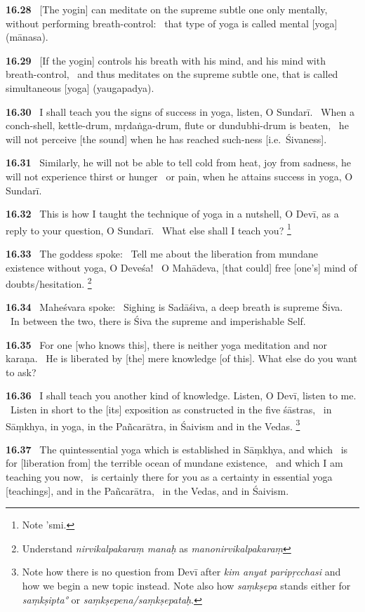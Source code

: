\documentclass{article}
\newcommand{\skt}[1]{\textit{#1}}
\begin{document}
\textbf{16.28}%
\ [The yogin] can meditate on the supreme subtle one only mentally, without performing breath-control:%
\                   that type of yoga is called mental [yoga] (mānasa).%


\textbf{16.29}%
\ [If the yogin] controls his breath with his mind, and his mind with breath-control,%
\                 and thus meditates on the supreme subtle one, that is called simultaneous [yoga] (yaugapadya).%


\textbf{16.30}%
\ I shall teach you the signs of success in yoga, listen, O Sundarī.%
\ When a conch-shell, kettle-drum, mṛdaṅga-drum, flute or dundubhi-drum is beaten,%
\                  he will not perceive [the sound] when he has reached such-ness [i.e.\ Śivaness].%


\textbf{16.31}%
\ Similarly, he will not be able to tell cold from heat, joy from sadness, he will not experience thirst or hunger%
\  or pain, when he attains success in yoga, O Sundarī.%


\textbf{16.32}%
\ This is how I taught the technique of yoga in a nutshell, O Devī, as a reply to your question, O Sundarī.%
\ What else shall I teach you?%
\footnote{Note 'smi. }%


\textbf{16.33}%
\ The goddess spoke:%
\ Tell me about the liberation from mundane existence without yoga, O Deveśa!%
\ O Mahādeva, [that could] free [one's] mind of doubts/hesitation.%
\footnote{Understand \skt{nirvikalpakaraṃ manaḥ} as \skt{manonirvikalpakaraṃ} }%


\textbf{16.34}%
\ Maheśvara spoke:%
\ Sighing is Sadāśiva, a deep breath is supreme Śiva.%
\ In between the two, there is Śiva the supreme and imperishable Self.%


\textbf{16.35}%
\ For one [who knows this], there is neither yoga meditation and nor karaṇa.%
\ He is liberated by [the] mere knowledge [of this]. What else do you want to ask?%


\textbf{16.36}%
\ I shall teach you another kind of knowledge. Listen, O Devī, listen to me.%
\ Listen in short to the [its] exposition as constructed in the five śāstras,%
\ in Sāṃkhya, in yoga, in the Pañcarātra, in Śaivism and in the Vedas.%
\footnote{Note how there is no question from Devī after \skt{kim anyat paripṛcchasi} and how we begin a new topic instead.                Note also how \skt{saṃkṣepa} stands either for \skt{saṃkṣipta°} or \skt{saṃkṣepena/saṃkṣepataḥ}. }%


\textbf{16.37}%
\ The quintessential yoga which is established in Sāṃkhya, and which%
\                 is for [liberation from] the terrible ocean of mundane existence,%
\ and which I am teaching you now,%
\ is certainly there for you as a certainty in essential yoga [teachings], and in the Pañcarātra,%
\ in the Vedas, and in Śaivism.%
\end{document}
